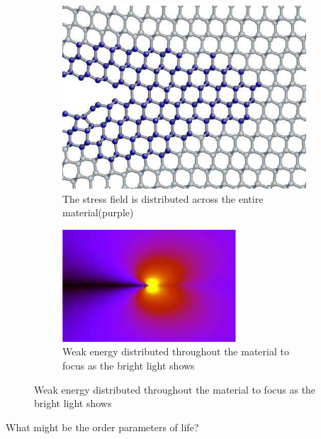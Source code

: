 \documentclass[]{article}
\begin{document}
\begin{figure}[H]
	\caption[Fracture Propagation]{Fracture Propagation\cite{bitzek2015atomistic}}\label{fig:fracture}
	\begin{subfigure}[t]{0.55\textwidth}
		\caption{The stress field is distributed across the entire material(purple)}\label{fig:stress:dist}
		\includegraphics[width=\textwidth]{fracture}
	\end{subfigure}
	\;\;\;\;
	\begin{subfigure}[t]{0.4\textwidth}
		\caption{Weak energy distributed throughout the material to focus as the bright light shows}\label{fig:stress-zoomed}
		\includegraphics[width=\textwidth]{stress-zoomed}
	\end{subfigure}
\end{figure}

What might be the order parameters of life?
\end{document}
